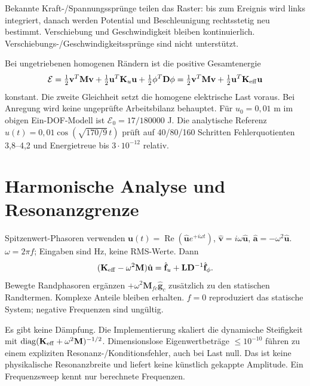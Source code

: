 Bekannte Kraft-/Spannungssprünge teilen das Raster: bis zum Ereignis wird links
integriert, danach werden Potential und Beschleunigung rechtsstetig neu
bestimmt. Verschiebung und Geschwindigkeit bleiben kontinuierlich.
Verschiebungs-/Geschwindigkeitssprünge sind nicht unterstützt.

Bei ungetriebenen homogenen Rändern ist die positive Gesamtenergie
\begin{equation}\label{eq:dynamic-energy}
\mathcal E=\tfrac12\mathbf v^T\mathbf M\mathbf v+
\tfrac12\mathbf u^T\mathbf K_u\mathbf u+
\tfrac12\phi^T\mathbf D\phi
=\tfrac12\mathbf v^T\mathbf M\mathbf v+
\tfrac12\mathbf u^T\mathbf K_{\rm eff}\mathbf u
\end{equation}
konstant. Die zweite Gleichheit setzt die homogene elektrische Last voraus.
Bei Anregung wird keine ungeprüfte Arbeitsbilanz behauptet.
Für $u_0=0{,}01$ m im obigen Ein-DOF-Modell ist
$\mathcal E_0=17/180000$ J.
Die analytische Referenz $u(t)=0{,}01\cos(\sqrt{170/9}\,t)$ prüft auf
40/80/160 Schritten Fehlerquotienten 3,8--4,2 und Energietreue bis
$3\cdot10^{-12}$ relativ.

\section{Harmonische Analyse und Resonanzgrenze}
Spitzenwert-Phasoren verwenden
$\mathbf u(t)=\operatorname{Re}(\hat{\mathbf u}e^{+i\omega t})$,
$\hat{\mathbf v}=i\omega\hat{\mathbf u}$,
$\hat{\mathbf a}=-\omega^2\hat{\mathbf u}$.
$\omega=2\pi f$; Eingaben sind Hz, keine RMS-Werte. Dann
\begin{equation}\label{eq:harmonic}
(\mathbf K_{\rm eff}-\omega^2\mathbf M)\hat{\mathbf u}
=\hat{\mathbf f}_u+\mathbf L\mathbf D^{-1}\hat{\mathbf f}_\phi.
\end{equation}
Bewegte Randphasoren ergänzen $+\omega^2\mathbf M_{fc}\hat{\mathbf g}_c$
zusätzlich zu den statischen Randtermen. Komplexe Anteile bleiben erhalten.
$f=0$ reproduziert das statische System; negative Frequenzen sind ungültig.

Es gibt keine Dämpfung. Die Implementierung skaliert die dynamische Steifigkeit
mit $\operatorname{diag}(\mathbf K_{\rm eff}+\omega^2\mathbf M)^{-1/2}$.
Dimensionslose Eigenwertbeträge $\le10^{-10}$ führen zu einem expliziten
Resonanz-/Konditionsfehler, auch bei Last null. Das ist keine physikalische
Resonanzbreite und liefert keine künstlich gekappte Amplitude.
Ein Frequenzsweep kennt nur berechnete Frequenzen.

